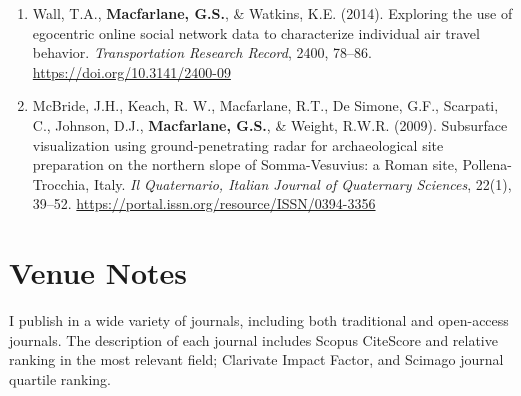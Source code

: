 \documentclass[margin,line]{res}
\newif\ifdetail{}
\newcounter{enuminitialize}
\newenvironment{myenum}[1][]
{%
 \setcounter{enuminitialize}{#1}
 \addtocounter{enuminitialize}{2}
 \begin{enumerate}[left= 4pt, itemsep=8pt, start=\value{enuminitialize}, label=\arabic*\addtocounter{enumi}{-2}]
}
{%
 \end{enumerate}
}
\begin{document}
\begin{resume}
\begin{myenum}[21]
  \item Wall, T.A., \textbf{Macfarlane, G.S.}, \& Watkins, K.E. (2014). Exploring the use of
egocentric online social network data to characterize individual air travel
behavior. \textit{ Transportation Research Record}, 2400, 78–86.
\url{https://doi.org/10.3141/2400-09} \ifdetail \textbf{Citations: 15}  \fi

  \item McBride, J.H., Keach, R. W., Macfarlane, R.T., De Simone, G.F., Scarpati, C.,
Johnson, D.J., \textbf{Macfarlane, G.S.}, \& Weight, R.W.R. (2009). Subsurface visualization using
ground-penetrating radar for archaeological site preparation on the northern
slope of Somma-Vesuvius: a Roman site, Pollena-Trocchia, Italy. \textit{ Il Quaternario,
Italian Journal of Quaternary Sciences}, 22(1), 39–52. \url{https://portal.issn.org/resource/ISSN/0394-3356} 
\end{myenum}

\ifdetail
\section{Venue Notes}
I publish in a wide variety of journals, including both traditional and open-access journals. 
The description of each journal includes Scopus CiteScore and relative ranking in the most
relevant field; Clarivate Impact Factor, and Scimago journal quartile ranking. 


\end{resume}
\end{document}
